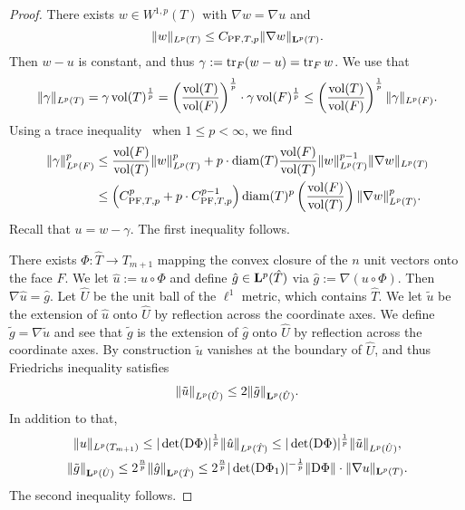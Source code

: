 \documentclass[a4paper]{article}
\begin{document}
\begin{proof}
    There exists $w \in W^{1,p}(T)$ with $\nabla w = \nabla u$ and 
    \[
        \| w \|_{L^{p}(T)}
        \leq 
        C_{{\rm PF},T,p} 
        \| \nabla w \|_{{\mathbf L}^{p}(T)}
        .
    \]
    Then $w-u$ is constant, and thus $\gamma := \operatorname{tr}_{F} (w-u) = \operatorname{tr}_{F} w$. 
    We use that 
    \[
        \| \gamma \|_{L^{p}(T)}
        =
        \gamma \operatorname{vol}(T)^\frac{1}{p}
        =
        \left( \frac{ \operatorname{vol}(T) }{ \operatorname{vol}(F) } \right)^\frac{1}{p}
        \cdot 
        \gamma 
        \operatorname{vol}(F)^\frac{1}{p}
        \leq 
        \left( \frac{ \operatorname{vol}(T) }{ \operatorname{vol}(F) } \right)^\frac{1}{p}
        \| \gamma \|_{L^{p}(F)}
        .
    \]
    Using a trace inequality~\cite[Lemma~2.8]{veeser2012poincare} when $1 \leq p < \infty$, we find 
    \begin{align*}
        \| \gamma \|_{L^{p}(F)}^{p}
        &
        \leq 
        \frac{ \operatorname{vol}(F) }{ \operatorname{vol}(T) }
        \| w \|_{L^{p}(T)}^{p}
        +
        p
        \cdot 
        {\operatorname{diam}}(T)
        \frac{ \operatorname{vol}(F) }{ \operatorname{vol}(T) }
        \| w \|_{L^{p}(T)}^{p-1}
        \| \nabla w \|_{L^{p}(T)}
        \\&
        \leq 
        \left( C_{{\rm PF},T,p}^{p} + p \cdot C_{{\rm PF},T,p}^{p-1} \right) 
        {\operatorname{diam}}(T)^{p}
        \left( \frac{ \operatorname{vol}(F) }{ \operatorname{vol}(T) } \right)
        \| \nabla w \|_{L^{p}(T)}^{p}
        .
    \end{align*}
    Recall that $u = w - \gamma$. The first inequality follows. 
    
    There exists $\Phi : \hat T \rightarrow T_{m+1}$ mapping the convex closure of the $n$ unit vectors onto the face $F$.
    We let $\hat u := u \circ \Phi$ and define $\hat g \in {\mathbf L}^p(\hat T)$ via $\hat g := \nabla ( u \circ \Phi )$. 
    Then $\nabla \hat u = \hat g$. 
    Let $\hat U$ be the unit ball of the $\ell^1$ metric, which contains $\hat T$.
    We let $\tilde u$ be the extension of $\hat u$ onto $\hat U$ by reflection across the coordinate axes.
    We define $\tilde g = \nabla \tilde u$
    and see that $\tilde g$ is the extension of $\hat g$ onto $\hat U$ by reflection across the coordinate axes. 
    By construction $\tilde u$ vanishes at the boundary of $\hat U$, and thus Friedrichs inequality satisfies 
    \begin{gather*}
        \| \tilde u \|_{L^{p}(\hat U)} 
        \leq 
        2 
        \| \tilde g \|_{{\mathbf L}^{p}(\hat U)}
        .
    \end{gather*}
    In addition to that, 
    \begin{gather*}
        \| u \|_{L^{p}(T_{m+1})}
        \leq 
        |\det({\mathrm D} \Phi)|^{\frac 1 p} 
        \| \hat u \|_{L^{p}(\hat T)}
        \leq 
        |\det({\mathrm D} \Phi)|^{\frac 1 p} 
        \| \tilde u \|_{L^{p}(\hat U)}
        ,
        \\
        \| \tilde g \|_{{\mathbf L}^{p}(\hat U)}
        \leq 
        2^{\frac n p}
        \| \hat g \|_{{\mathbf L}^{p}(\hat T)}
        \leq 
        2^{\frac n p}
        |\det({\mathrm D} \Phi_1)|^{-\frac 1 p} \| {\mathrm D} \Phi \| \cdot 
        \| \nabla u \|_{{\mathbf L}^{p}(T)}
        .
    \end{gather*}
    The second inequality follows.
\end{proof}
\end{document}
